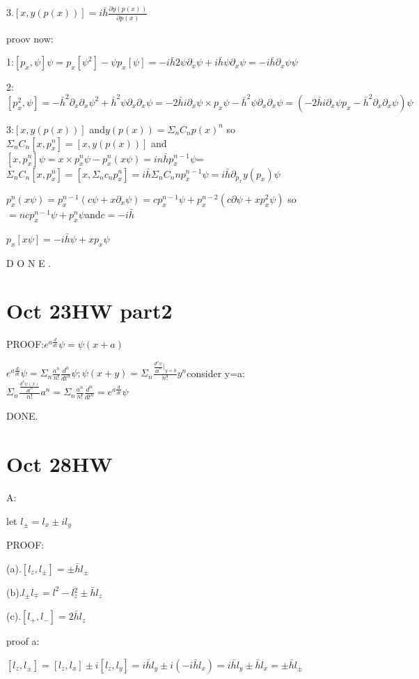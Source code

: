 \documentclass{article}
\begin{document}
3.$[x,y(p(x))]=i\bar h \frac{\partial y(p(x))}{\partial p(x)}$

proov now:


1:$[p_x , \psi]\psi = p_x[\psi^2]-\psi p_x[\psi]=-i\bar h 2 \psi \partial_x \psi + i\bar h\psi\partial_x\psi=-i\bar h \partial_x\psi \psi$

2:$[p_x^2,\psi]=-{\bar h}^2\partial_x\partial_x\psi^2+{\bar h}^2\psi\partial_x\partial_x\psi=-2{\bar h}i\partial_x\psi\times p_x\psi-{\bar h}^2\psi\partial_x\partial_x\psi=(-2{\bar h}i\partial_x\psi p_x-{\bar h}^2\partial_x\partial_x\psi)\psi$

3:$[x,y(p(x))]$ and$ y(p(x))=\Sigma_nC_np(x)^n$ so $\Sigma_nC_n[x,p_x^n]=[x,y(p(x))]$ and $[x,p_x^n]\psi=x\times p_x^n\psi-p_x^n(x\psi)=in\bar hp_x^{n-1}\psi$=$\Sigma_nC_n[x,p_x^n]=[x,\Sigma_nc_np_x^n]=i\bar h \Sigma_nC_n n p_x^{n-1}\psi=i\bar h \partial_{p_x}y(p_x)\psi$

$p_x^n(x\psi)=p_x^{n-1}(c\psi+x\partial_x\psi)=cp_x^{n-1}\psi+p_x^{n-2}(c\partial\psi+xp_x^2\psi)$ so $=ncp_x^{n-1}\psi+p_x^n\psi$and$c=-i\bar h$

$p_x[x\psi]=-i\bar h \psi + xp_x\psi$

D O N E .

\section{Oct 23HW part2}

PROOF:$e^{a\frac d{dt}}\psi=\psi(x+a)$

$e^{a\frac d{dt}}\psi=\Sigma_n\frac{a^n}{n!}\frac{d^n}{dt^n}\psi;\psi(x+y)=\Sigma_n\frac{\frac{d^n\psi}{dt^n}|_{y=0}}{n!}y^n$consider y=a:$\Sigma_n\frac{\frac{d^n\psi(x)}{dt^n}}{n!}a^n=\Sigma_n\frac{a^n}{n!}\frac{d^n}{dt^n}=e^{a\frac d{dt}}\psi$

DONE.

\section{Oct 28HW}

A:

let $l_{\pm}=l_x\pm il_y$

PROOF:

(a).$[l_z,l_\pm]=\pm\bar hl_\pm$

(b).$l_\pm l_\mp=l^2-l{_z^2}\pm\bar hl_z$

(c).$[l_+,l_-]=2\bar hl_z$

proof a:

$[l_z,l_\pm]=[l_z,l_x]\pm i[l_z,l_y]=i\bar hl_y\pm i(-i\bar hl_x)=i\bar hl_y\pm \bar hl_x=\pm\bar hl_\pm$
\end{document}

